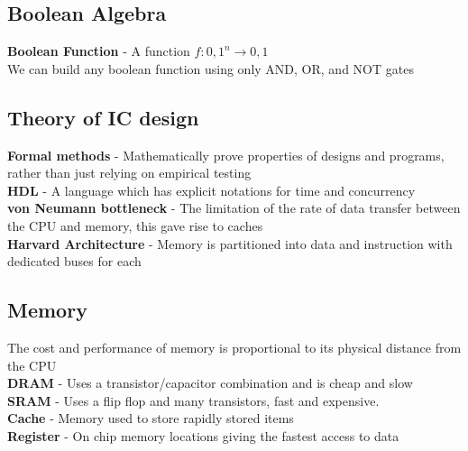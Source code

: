\documentclass{article}[18pt]
\begin{document}
\subsection{Boolean Algebra}
\textbf{Boolean Function} - A function $f:{0,1}^n \rightarrow {0,1}$\\
We can build any boolean function using only AND, OR, and NOT gates
\subsection{Theory of IC design}
\textbf{Formal methods} - Mathematically prove properties of designs and programs, rather than just relying on empirical testing\\
\textbf{HDL} - A language which has explicit notations for time and concurrency\\
\textbf{von Neumann bottleneck} - The limitation of the rate of data transfer between the CPU and memory, this gave rise to caches\\
\textbf{Harvard Architecture} - Memory is partitioned into data and instruction with dedicated buses for each
\subsection{Memory}
The cost and performance of memory is proportional to its physical distance from the CPU\\
\textbf{DRAM} - Uses a transistor/capacitor combination and is cheap and slow\\
\textbf{SRAM} - Uses a flip flop and many transistors, fast and expensive.\\
\textbf{Cache} - Memory used to store rapidly stored items\\
\textbf{Register} - On chip memory locations giving the fastest access to data
\end{document}
